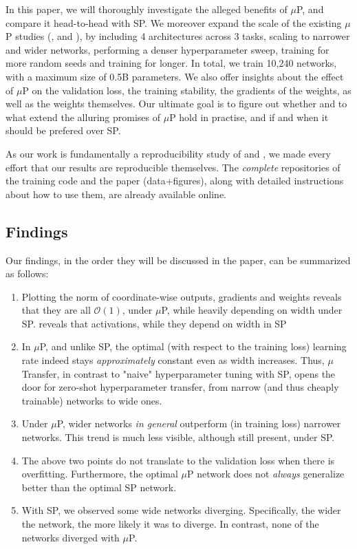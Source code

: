 \documentclass{article}
\begin{document}
In this paper, we will thoroughly investigate the alleged benefits of $\mu$P, and compare it head-to-head with SP. We moreover expand the scale of the existing $\mu$P studies (\cite{yang2020feature}, \cite{yang2021tuning} and \cite{lingle2024large}), by including 4 architectures across 3 tasks, scaling to narrower and wider networks, performing a denser hyperparameter sweep, training for more random seeds and training for longer. In total, we train 10,240 networks, with a maximum size of 0.5B parameters. We also offer insights about the effect of $\mu$P on the validation loss, the training stability, the gradients of the weights, as well as the weights themselves. Our ultimate goal is to figure out whether and to what extend the alluring promises of $\mu$P hold in practise, and if and when it should be prefered over SP.

As our work is fundamentally a reproducibility study of \cite{yang2020feature} and \cite{yang2021tuning}, we made every effort that our results are reproducible themselves. The \textit{complete} repositories of the training code and the paper (data+figures), along with detailed instructions about how to use them, are already available online.

\subsection{Findings}
Our findings, in the order they will be discussed in the paper, can be summarized as follows:
\begin{enumerate}
    \item Plotting the norm of coordinate-wise outputs, gradients and weights reveals that they are all $\mathcal{O}(1)$, under $\mu$P, while heavily depending on width under SP.
reveals that activations, while they depend on width in SP
    \item In $\mu$P, and unlike SP, the optimal (with respect to the training loss) learning rate indeed stays \textit{approximately} constant even as width increases. Thus, $\mu$Transfer, in contrast to "naive" hyperparameter tuning with SP, opens the door for zero-shot hyperparameter transfer, from narrow (and thus cheaply trainable) networks to wide ones.
    \item Under $\mu$P, wider networks \textit{in general} outperform (in training loss) narrower networks. This trend is much less visible, although still present, under SP.
    \item The above two points do not translate to the validation loss when there is overfitting. Furthermore, the optimal $\mu$P network does not \textit{always} generalize better than the optimal SP network.
    \item With SP, we observed some wide networks diverging. Specifically, the wider the network, the more likely it was to diverge. In contrast, none of the networks diverged with $\mu$P.
\end{enumerate}
\end{document}
